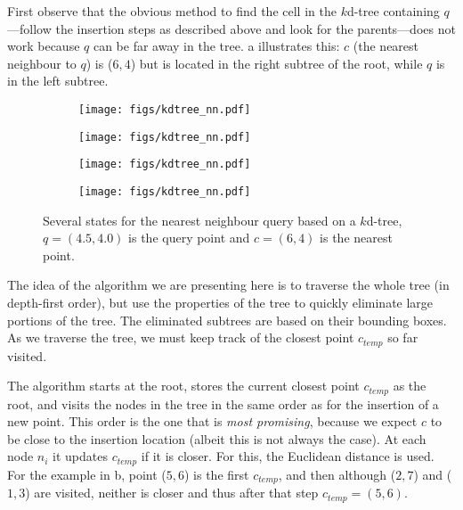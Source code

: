 First observe that the obvious method to find the cell in the $k$d-tree containing $q$---follow the insertion steps as described above and look for the parents---does not work because $q$ can be far away in the tree.
a illustrates this: $c$ (the nearest neighbour to $q$) is ($6,4$) but is located in the right subtree of the root, while $q$ is in the left subtree.
\begin{figure*}
  \centering
  \begin{subfigure}[b]{0.6\linewidth}
    \centering
    \texttt{[image: figs/kdtree\_nn.pdf]}
    \caption{}
  \end{subfigure}
  \begin{subfigure}[b]{0.6\linewidth}
    \centering
    \texttt{[image: figs/kdtree\_nn.pdf]}
    \caption{}
  \end{subfigure}
  \begin{subfigure}[b]{0.6\linewidth}
    \centering
    \texttt{[image: figs/kdtree\_nn.pdf]}
    \caption{}
  \end{subfigure}
  \begin{subfigure}[b]{0.6\linewidth}
    \centering
    \texttt{[image: figs/kdtree\_nn.pdf]}
    \caption{}
  \end{subfigure}
\caption{Several states for the nearest neighbour query based on a $k$d-tree, $q=(4.5, 4.0)$ is the query point and $c=(6,4)$ is the nearest point.}%
\end{figure*}


%

The idea of the algorithm we are presenting here is to traverse the whole tree (in depth-first order), but use the properties of the tree to quickly eliminate large portions of the tree.
The eliminated subtrees are based on their bounding boxes.
As we traverse the tree, we must keep track of the closest point $c_{temp}$ so far visited.


The algorithm starts at the root, stores the current closest point $c_{temp}$ as the root, and visits the nodes in the tree in the same order as for the insertion of a new point.
This order is the one that is \emph{most promising}, because we expect $c$ to be close to the insertion location (albeit this is not always the case).
At each node $n_i$ it updates $c_{temp}$ if it is closer.
For this, the Euclidean distance is used.
For the example in b, point ($5,6$) is the first $c_{temp}$, and then although ($2,7$) and ($1,3$) are visited, neither is closer and thus after that step $c_{temp} = (5,6)$.

